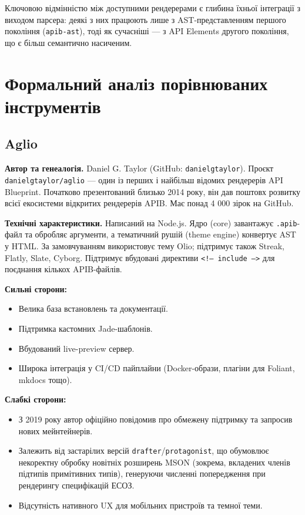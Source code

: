 \documentclass{article}
\begin{document}
Ключовою відмінністю між доступними рендерерами є глибина їхньої інтеграції з виходом парсера: деякі з них працюють лише з AST-представленням першого покоління (\texttt{apib-ast}), тоді як сучасніші — з API Elements другого покоління, що є більш семантично насиченим.

\section{Формальний аналіз порівнюваних інструментів}

\subsection{Aglio}
\textbf{Автор та генеалогія.} Daniel G. Taylor (GitHub: \texttt{danielgtaylor}). Проєкт \texttt{danielgtaylor/aglio} — один із перших і найбільш відомих рендерерів API Blueprint. Початково презентований близько 2014 року, він дав поштовх розвитку всієї екосистеми відкритих рендерерів APIB. Має понад 4 000 зірок на GitHub.

\textbf{Технічні характеристики.} Написаний на Node.js. Ядро (core) завантажує \texttt{.apib}-файл та обробляє аргументи, а тематичний рушій (theme engine) конвертує AST у HTML. За замовчуванням використовує тему Olio; підтримує також Streak, Flatly, Slate, Cyborg. Підтримує вбудовані директиви \texttt{<!-- include -->} для поєднання кількох APIB-файлів.

\textbf{Сильні сторони:}
\begin{itemize}
\item Велика база встановлень та документації.
\item Підтримка кастомних Jade-шаблонів.
\item Вбудований live-preview сервер.
\item Широка інтеграція у CI/CD пайплайни (Docker-образи, плагіни для Foliant, mkdocs тощо).
\end{itemize}

\textbf{Слабкі сторони:}
\begin{itemize}
\item З 2019 року автор офіційно повідомив про обмежену підтримку та запросив нових мейнтейнерів.
\item Залежить від застарілих версій \texttt{drafter}/\texttt{protagonist}, що обумовлює некоректну обробку новітніх розширень MSON (зокрема, вкладених членів підтипів примітивних типів), генеруючи численні попередження при рендерингу специфікацій ЕСОЗ.
\item Відсутність нативного UX для мобільних пристроїв та темної теми.
\end{itemize}
\end{document}
